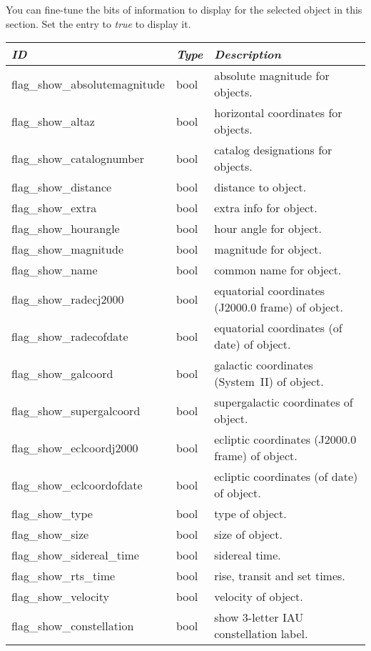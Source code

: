 You can fine-tune the bits of information to display for the selected object in this section. Set the entry to \emph{true} to display it.

\begin{longtable}{l|l|l}\toprule
\emph{ID} & \emph{Type} & \emph{Description}\\\midrule
flag\_show\_absolutemagnitude & bool & absolute magnitude for objects.\\%
flag\_show\_altaz             & bool & horizontal coordinates for objects.\\%
flag\_show\_catalognumber     & bool & catalog designations for objects.\\%
flag\_show\_distance          & bool & distance to object.\\%
flag\_show\_extra             & bool & extra info for object.\\%
flag\_show\_hourangle         & bool & hour angle for object.\\%
flag\_show\_magnitude         & bool & magnitude for object.\\%
flag\_show\_name              & bool & common name for object.\\%
flag\_show\_radecj2000        & bool & equatorial coordinates (J2000.0 frame) of object.\\%
flag\_show\_radecofdate       & bool & equatorial coordinates (of date) of object.\\%
flag\_show\_galcoord          & bool & galactic coordinates (System~II) of object.\\%
flag\_show\_supergalcoord     & bool & supergalactic coordinates of object.\\%
flag\_show\_eclcoordj2000     & bool & ecliptic coordinates (J2000.0 frame) of object.\\%
flag\_show\_eclcoordofdate    & bool & ecliptic coordinates (of date) of object.\\%
flag\_show\_type              & bool & type of object.\\%
flag\_show\_size              & bool & size of object.\\%
flag\_show\_sidereal\_time    & bool & sidereal time.\\%
flag\_show\_rts\_time         & bool & rise, transit and set times.\\%
flag\_show\_velocity          & bool & velocity of object.\\%
flag\_show\_constellation     & bool & show 3-letter IAU\index{IAU} constellation label.\\\bottomrule
\end{longtable}


